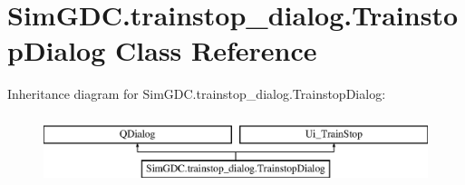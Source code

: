 \hypertarget{class_sim_g_d_c_1_1trainstop__dialog_1_1_trainstop_dialog}{}\section{Sim\+G\+D\+C.\+trainstop\+\_\+dialog.\+Trainstop\+Dialog Class Reference}
\label{class_sim_g_d_c_1_1trainstop__dialog_1_1_trainstop_dialog}
Inheritance diagram for Sim\+G\+D\+C.\+trainstop\+\_\+dialog.\+Trainstop\+Dialog\+:\begin{figure}[H]
\begin{center}
\leavevmode
\includegraphics[height=2.000000cm]{class_sim_g_d_c_1_1trainstop__dialog_1_1_trainstop_dialog}
\end{center}
\end{figure}
